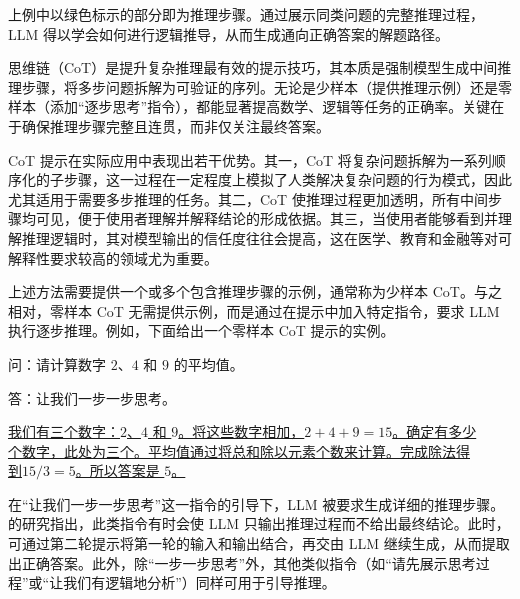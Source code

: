 \noindent 上例中以绿色标示的部分即为推理步骤。通过展示同类问题的完整推理过程，LLM 得以学会如何进行逻辑推导，从而生成通向正确答案的解题路径。

\begin{importantnote}
思维链（CoT）是提升复杂推理最有效的提示技巧，其本质是强制模型生成中间推理步骤，将多步问题拆解为可验证的序列。无论是少样本（提供推理示例）还是零样本（添加“逐步思考”指令），都能显著提高数学、逻辑等任务的正确率。关键在于确保推理步骤完整且连贯，而非仅关注最终答案。
\end{importantnote}

CoT 提示在实际应用中表现出若干优势。其一，CoT 将复杂问题拆解为一系列顺序化的子步骤，这一过程在一定程度上模拟了人类解决复杂问题的行为模式，因此尤其适用于需要多步推理的任务。其二，CoT 使推理过程更加透明，所有中间步骤均可见，便于使用者理解并解释结论的形成依据。其三，当使用者能够看到并理解推理逻辑时，其对模型输出的信任度往往会提高，这在医学、教育和金融等对可解释性要求较高的领域尤为重要。

上述方法需要提供一个或多个包含推理步骤的示例，通常称为少样本 CoT。与之相对，零样本 CoT 无需提供示例，而是通过在提示中加入特定指令，要求 LLM 执行逐步推理。例如，下面给出一个零样本 CoT 提示的实例。

\vspace{0.5em}
\begin{tcolorbox}
\begingroup
\setlength{\leftskip}{2em}
\setlength{\rightskip}{2em}

问：请计算数字 $2$、$4$ 和 $9$ 的平均值。

\vspace{0.3em}

答：\textcolor[RGB]{46,125,50}{让我们一步一步思考。}

\vspace{0.3em}

\parbox{\linewidth}{%
\uline{
我们有三个数字：$2$、$4$ 和 $9$。将这些数字相加，$2+4+9=15$。确定有多少 \\
个数字，此处为三个。平均值通过将总和除以元素个数来计算。完成除法得\\ 
到$15/3 = 5$。所以答案是 $5$。}%
}

\endgroup
\end{tcolorbox}
\vspace{0.5em}

在“让我们一步一步思考”这一指令的引导下，LLM 被要求生成详细的推理步骤。\citet{kojima-etal:2022large} 的研究指出，此类指令有时会使 LLM 只输出推理过程而不给出最终结论。此时，可通过第二轮提示将第一轮的输入和输出结合，再交由 LLM 继续生成，从而提取出正确答案。此外，除“一步一步思考”外，其他类似指令（如“请先展示思考过程”或“让我们有逻辑地分析”）同样可用于引导推理。

